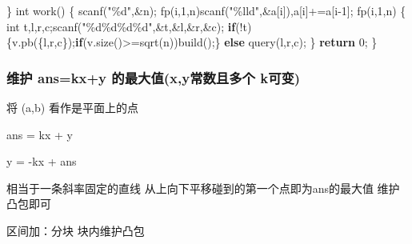 \documentclass[
]{article}
\newenvironment{Shaded}{}{}
\newcommand{\ControlFlowTok}[1]{\textcolor[rgb]{0.00,0.44,0.13}{\textbf{#1}}}
\newcommand{\DataTypeTok}[1]{\textcolor[rgb]{0.56,0.13,0.00}{#1}}
\newcommand{\DecValTok}[1]{\textcolor[rgb]{0.25,0.63,0.44}{#1}}
\newcommand{\NormalTok}[1]{#1}
\newcommand{\SpecialCharTok}[1]{\textcolor[rgb]{0.25,0.44,0.63}{#1}}
\newcommand{\StringTok}[1]{\textcolor[rgb]{0.25,0.44,0.63}{#1}}
\begin{document}
\begin{Shaded}
\begin{Highlighting}[]
\NormalTok{\}}
\DataTypeTok{int}\NormalTok{ work()}
\NormalTok{\{}
\NormalTok{    scanf(}\StringTok{"}\SpecialCharTok{\%d}\StringTok{"}\NormalTok{,\&n);}
\NormalTok{    fp(i,}\DecValTok{1}\NormalTok{,n)scanf(}\StringTok{"}\SpecialCharTok{\%lld}\StringTok{"}\NormalTok{,\&a[i]),a[i]+=a[i{-}}\DecValTok{1}\NormalTok{];}
\NormalTok{    fp(i,}\DecValTok{1}\NormalTok{,n)}
\NormalTok{    \{}
        \DataTypeTok{int}\NormalTok{ t,l,r,c;scanf(}\StringTok{"}\SpecialCharTok{\%d\%d\%d\%d}\StringTok{"}\NormalTok{,\&t,\&l,\&r,\&c);}
        \ControlFlowTok{if}\NormalTok{(!t)\{v.pb(\{l,r,c\});}\ControlFlowTok{if}\NormalTok{(v.size()\textgreater{}=sqrt(n))build();\}}
        \ControlFlowTok{else}\NormalTok{ query(l,r,c);}
\NormalTok{    \}}
    \ControlFlowTok{return} \DecValTok{0}\NormalTok{;}
\NormalTok{\}}
\end{Highlighting}
\end{Shaded}

\hypertarget{ux7ef4ux62a4-anskxy-ux7684ux6700ux5927ux503cxyux5e38ux6570ux4e14ux591aux4e2a-kux53efux53d8}{%
\subsubsection{维护 ans=kx+y 的最大值(x,y常数且多个
k可变)}\label{ux7ef4ux62a4-anskxy-ux7684ux6700ux5927ux503cxyux5e38ux6570ux4e14ux591aux4e2a-kux53efux53d8}}

将 (a,b) 看作是平面上的点

ans = kx + y

y = -kx + ans

相当于一条斜率固定的直线 从上向下平移碰到的第一个点即为ans的最大值
维护凸包即可

区间加：分块 块内维护凸包
\end{document}
